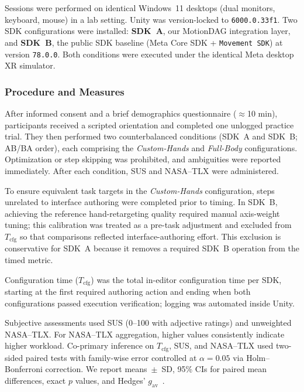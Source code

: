 Sessions were performed on identical Windows~11 desktops (dual monitors, keyboard, mouse) in a lab setting.
Unity was version-locked to \texttt{6000.0.33f1}.
Two SDK configurations were installed: \textbf{SDK~A}, our MotionDAG integration layer, and \textbf{SDK~B}, the public SDK baseline (Meta Core SDK + \texttt{Movement SDK}) at version \texttt{78.0.0}. 
Both conditions were executed under the identical Meta desktop XR simulator.

\subsubsection{Procedure and Measures}\label{subsubsec:procedure-meature}
After informed consent and a brief demographics questionnaire ($\approx$10 min), participants received a scripted orientation and completed one unlogged practice trial. 
They then performed two counterbalanced conditions (SDK~A and SDK~B; AB/BA order), each comprising the \textit{Custom-Hands} and \textit{Full-Body} configurations. 
Optimization or step skipping was prohibited, and ambiguities were reported immediately. 
After each condition, SUS and NASA--TLX were administered.

To ensure equivalent task targets in the \textit{Custom-Hands} configuration, steps unrelated to interface authoring were completed prior to timing. 
In SDK~B, achieving the reference hand-retargeting quality required manual axis-weight tuning; this calibration was treated as a pre-task adjustment and excluded from $T_{\mathrm{cfg}}$ so that comparisons reflected interface-authoring effort. 
This exclusion is conservative for SDK~A because it removes a required SDK~B operation from the timed metric.

Configuration time ($T_{\mathrm{cfg}}$) was the total in-editor configuration time per SDK, starting at the first required authoring action and ending when both configurations passed execution verification; logging was automated inside Unity. 

Subjective assessments used SUS (0--100 with adjective ratings) and unweighted NASA--TLX. 
For NASA--TLX aggregation, higher values consistently indicate higher workload. 
Co-primary inference on $T_{\mathrm{cfg}}$, SUS, and NASA--TLX used two-sided paired tests with family-wise error controlled at $\alpha{=}0.05$ via Holm--Bonferroni correction. 
We report means~$\pm$~SD, 95\% CIs for paired mean differences, exact $p$ values, and Hedges’ $g_{\mathrm{av}}$~\cite{lakens2013,morris2002}. 

